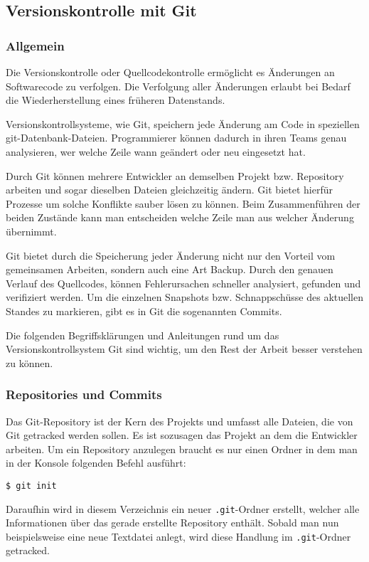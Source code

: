 \subsection{Versionskontrolle mit Git}
\subsubsection{Allgemein}

Die Versionskontrolle oder Quellcodekontrolle ermöglicht es Änderungen an
Softwarecode zu verfolgen. Die Verfolgung aller Änderungen erlaubt bei Bedarf
die Wiederherstellung eines früheren Datenstands.

Versionskontrollsysteme, wie Git, speichern jede Änderung am Code in speziellen
git-Datenbank-Dateien. Programmierer können dadurch in ihren Teams genau
analysieren, wer welche Zeile wann geändert oder neu eingesetzt hat.

Durch Git können mehrere Entwickler an demselben Projekt bzw. Repository
arbeiten und sogar dieselben Dateien gleichzeitig ändern. Git bietet hierfür
Prozesse um solche Konflikte sauber lösen zu können. Beim Zusammenführen der
beiden Zustände kann man entscheiden welche Zeile man aus welcher Änderung
übernimmt.

Git bietet durch die Speicherung jeder Änderung nicht nur den Vorteil vom
gemeinsamen Arbeiten, sondern auch eine Art \glqq Backup\grqq{}. Durch den
genauen Verlauf des Quellcodes, können Fehlerursachen schneller analysiert,
gefunden und verifiziert werden. Um die einzelnen Snapshots bzw. Schnappschüsse
des aktuellen Standes zu markieren, gibt es in Git die sogenannten Commits.

\newpage

Die folgenden Begriffsklärungen und Anleitungen rund um das
Versionskontrollsystem Git sind wichtig, um den Rest der Arbeit besser verstehen
zu können.

\subsubsection{Repositories und Commits}
Das Git-Repository ist der Kern des Projekts und umfasst alle Dateien, die von
Git getracked werden sollen. Es ist sozusagen das Projekt an dem die Entwickler
arbeiten. Um ein Repository anzulegen braucht es nur einen Ordner in dem man
in der Konsole folgenden Befehl ausführt:
\begin{lstlisting}[style=Bash]
    $ git init
\end{lstlisting}
Daraufhin wird in diesem Verzeichnis ein neuer \texttt{.git}-Ordner erstellt,
welcher alle Informationen über das gerade erstellte Repository enthält. Sobald
man nun beispielsweise eine neue Textdatei anlegt, wird diese Handlung im
\texttt{.git}-Ordner getracked.

